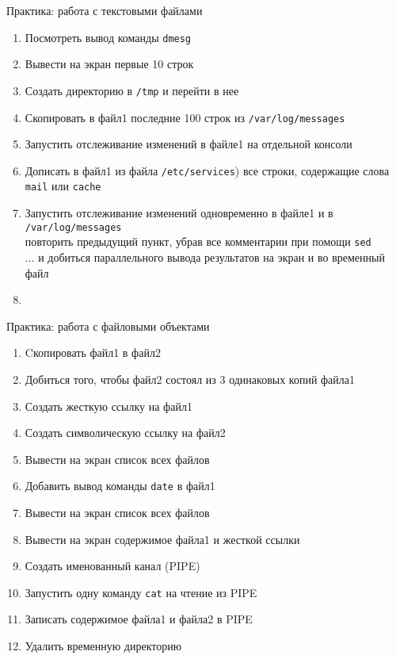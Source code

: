 \begin{frame}[fragile]{Практика: работа с текстовыми файлами}
  \begin{enumerate}
	  \item Посмотреть вывод команды {\tt dmesg}
	  \item Вывести на экран первые 10 строк 
		  \pause
	  \item Создать директорию в {\tt /tmp} и перейти в нее
	  \item Скопировать в файл1 последние 100 строк из {\tt /var/log/messages}
	  \item Запустить отслеживание изменений в файле1 на отдельной консоли
	  \item Дописать в файл1 из файла {\tt /etc/services}) все строки,
		  содержащие слова {\tt mail} или {\tt cache}
		  \pause
	  \item Запустить отслеживание изменений одновременно в файле1 и в {\tt /var/log/messages}\\
		  \pause
			повторить предыдущий пункт, убрав все комментарии при помощи {\tt sed}\\
		  \pause
		  ... и добиться параллельного вывода результатов на экран и во временный файл
	  \item
  \end{enumerate}
\end{frame}

\begin{frame}{Практика: работа с файловыми объектами}
	\begin{enumerate}
		\item Cкопировать файл1 в файл2
			\pause
		\item Добиться того, чтобы файл2 состоял из 3 одинаковых копий файла1
		\item Создать жесткую ссылку на файл1
		\item Создать символическую ссылку на файл2
		\item Вывести на экран список всех файлов
			\pause
		\item Добавить вывод команды {\tt date} в файл1
		\item Вывести на экран список всех файлов
		\item Вывести на экран содержимое файла1 и жесткой ссылки
		\item Создать именованный канал (PIPE)
		\item Запустить одну команду {\tt cat} на чтение из PIPE
		\item Записать содержимое файла1 и файла2 в PIPE
		\item Удалить временную директорию
	\end{enumerate}
\end{frame}


